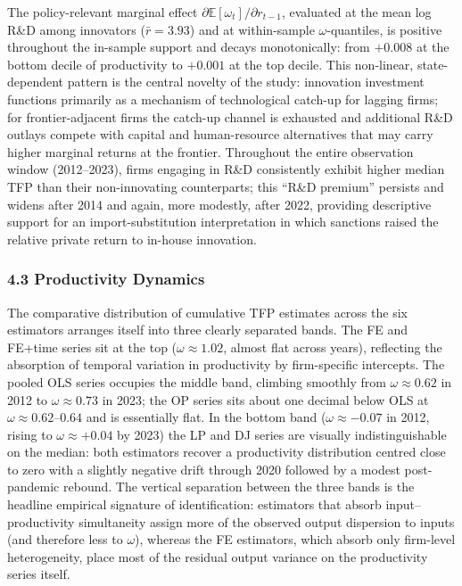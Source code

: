 \documentclass[a4paper, 12pt]{article}
\begin{document}
The policy-relevant marginal effect $\partial \mathbb{E}[\omega_t]/\partial r_{t-1}$, evaluated at the mean log R\&D among innovators ($\bar{r} = 3.93$) and at within-sample $\omega$-quantiles, is positive throughout the in-sample support and decays monotonically: from $+0.008$ at the bottom decile of productivity to $+0.001$ at the top decile. This non-linear, state-dependent pattern is the central novelty of the study: innovation investment functions primarily as a mechanism of technological catch-up for lagging firms; for frontier-adjacent firms the catch-up channel is exhausted and additional R\&D outlays compete with capital and human-resource alternatives that may carry higher marginal returns at the frontier. Throughout the entire observation window (2012--2023), firms engaging in R\&D consistently exhibit higher median TFP than their non-innovating counterparts; this ``R\&D premium'' persists and widens after 2014 and again, more modestly, after 2022, providing descriptive support for an import-substitution interpretation in which sanctions raised the relative private return to in-house innovation.

\subsubsection{4.3 Productivity Dynamics}

The comparative distribution of cumulative TFP estimates across the six estimators arranges itself into three clearly separated bands. The FE and FE+time series sit at the top ($\omega \approx 1.02$, almost flat across years), reflecting the absorption of temporal variation in productivity by firm-specific intercepts. The pooled OLS series occupies the middle band, climbing smoothly from $\omega \approx 0.62$ in 2012 to $\omega \approx 0.73$ in 2023; the OP series sits about one decimal below OLS at $\omega \approx 0.62$--$0.64$ and is essentially flat. In the bottom band ($\omega \approx -0.07$ in 2012, rising to $\omega \approx +0.04$ by 2023) the LP and DJ series are visually indistinguishable on the median: both estimators recover a productivity distribution centred close to zero with a slightly negative drift through 2020 followed by a modest post-pandemic rebound. The vertical separation between the three bands is the headline empirical signature of identification: estimators that absorb input--productivity simultaneity assign more of the observed output dispersion to inputs (and therefore less to $\omega$), whereas the FE estimators, which absorb only firm-level heterogeneity, place most of the residual output variance on the productivity series itself.
\end{document}
